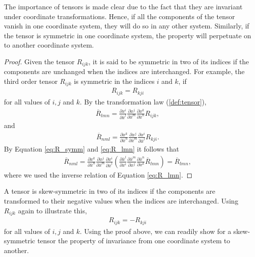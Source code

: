 \documentclass[main.tex]{subfiles}
\begin{document}
The importance of tensors is made clear due to the fact that they are invariant under coordinate 
transformations. Hence, if all the components of the tensor vanish in one coordinate system, 
they will do so in any other system. Similarly, if the tensor is symmetric in one coordinate system, 
the property will perpetuate on to another coordinate system.
\begin{proof}
Given the tensor $R_{ijk}$, it is said to be symmetric in two of its indices if the components are 
unchanged when the indices are interchanged. For example, the third order tensor $R_{ijk}$ is 
symmetric in the indices $i$ and $k$, if
\begin{align} \label{eq:R_symm}
R_{ijk} = R_{kji}
\end{align}
for all values of $i,j$ and $k$. By the transformation law (\ref{def:tensor}),
\begin{align} \label{eq:R_lmn}
\overline{R}_{lmn}= \frac{\partial x^i}{\partial \bar{x}^l} 
						  \frac{\partial x^j}{\partial \bar{x}^m} 
						  \frac{\partial x^k}{\partial \bar{x}^n} R_{ijk},
\end{align}
and
\begin{align*}
\overline{R}_{nml}= \frac{\partial x^k}{\partial \bar{x}^n} 
						  \frac{\partial x^j}{\partial \bar{x}^m} 
						  \frac{\partial x^i}{\partial \bar{x}^l} R_{kji}.
\end{align*}
By Equation \eqref{eq:R_symm} and \eqref{eq:R_lmn} it follows that
\begin{align*}
\overline{R}_{nml} = \frac{\partial x^k}{\partial \bar{x}^n} 
						  \frac{\partial x^j}{\partial \bar{x}^m} 
						  \frac{\partial x^i}{\partial \bar{x}^l} 
				   \left(\frac{\partial \bar{x}^l}{\partial x^i}
						  \frac{\partial \bar{x}^m}{\partial x^j}
						  \frac{\partial \bar{x}^n}{\partial x^k} \overline{R}_{lmn}
						  \right)
						= 	\overline{R}_{lmn},
\end{align*}
where we used the inverse relation of Equation \eqref{eq:R_lmn}.
\end{proof}
A tensor is skew-symmetric in two of its indices if the components are transformed to 
their negative values when the indices are interchanged. Using $R_{ijk}$ again to 
illustrate this,
\begin{align*}
R_{ijk} = -R_{kji}
\end{align*}
for all values of $i,j$ and $k$. Using the proof above, we can readily show for a 
skew-symmetric tensor the property of invariance from one coordinate system to 
another.
\end{document}
